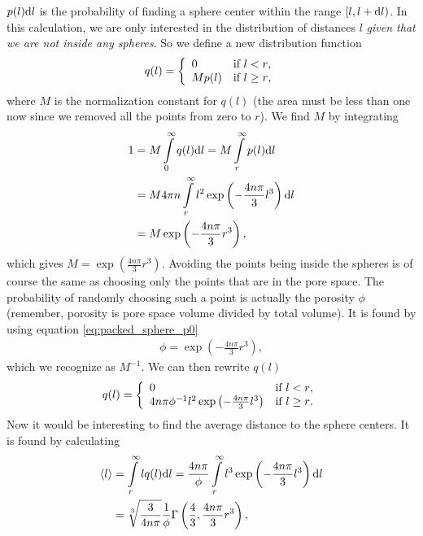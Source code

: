 $p(l)\mathrm{d}l$ is the probability of finding a sphere center within the range $[l, l+\mathrm{d}l)$. In this calculation, we are only interested in the distribution of distances $l$ \textit{given that we are not inside any spheres}. So we define a new distribution function
\begin{align}
	q(l) = \left\{\begin{array}{l l}
			0 & \text{if $l<r$},\\
			Mp(l) & \text{if $l\geq r$},
			\end{array}\right.
\end{align}
where $M$ is the normalization constant for $q(l)$ (the area must be less than one now since we removed all the points from zero to $r$). We find $M$ by integrating
\begin{align}
	1 &= M\int\limits_0^\infty q(l)\mathrm{d}l = M\int\limits_r^\infty p(l)\mathrm{d}l\\
	&= M4\pi n\int\limits_r^\infty l^2 \exp\left(-\frac{4n\pi}{3}l^3\right) \mathrm{d}l\\
	&= M\exp\left(-\frac{4n\pi}{3}r^3\right),
\end{align}
which gives $M=\exp\left(\frac{4n\pi}{3}r^3\right)$. Avoiding the points being inside the spheres is of course the same as choosing only the points that are in the pore space. The probability of randomly choosing such a point is actually the porosity $\phi$ (remember, porosity is pore space volume divided by total volume). It is found by using equation \eqref{eq:packed_sphere_p0}
\begin{align}
	\label{eq:packed_sphere_porosity}
	\phi = \exp\left(-\frac{4n\pi}{3}r^3\right),
\end{align}
which we recognize as $M^{-1}$. We can then rewrite $q(l)$
\begin{align}
	q(l) = \left\{\begin{array}{l l}
			0 & \text{if $l<r$},\\
			4n\pi\phi^{-1} l^2 \exp\left(-\frac{4n\pi}{3}l^3\right) & \text{if $l\geq r$}.
			\end{array}\right.
\end{align}
Now it would be interesting to find the average distance to the sphere centers. It is found by calculating
\begin{align}
	\langle l\rangle &= \int\limits_r^\infty lq(l) \mathrm{d}l = \frac{4n\pi}{\phi}\int\limits_r^\infty l^3 \exp\left(-\frac{4n\pi}{3}l^3\right) \mathrm{d}l \\
	\label{eq:packed_sphere_average_distance}
	&= \sqrt[3]{\frac{3}{4n\pi}}\frac{1}{\phi}\Gamma\left(\frac{4}{3}, \frac{4n\pi}{3}r^3\right),
\end{align}
